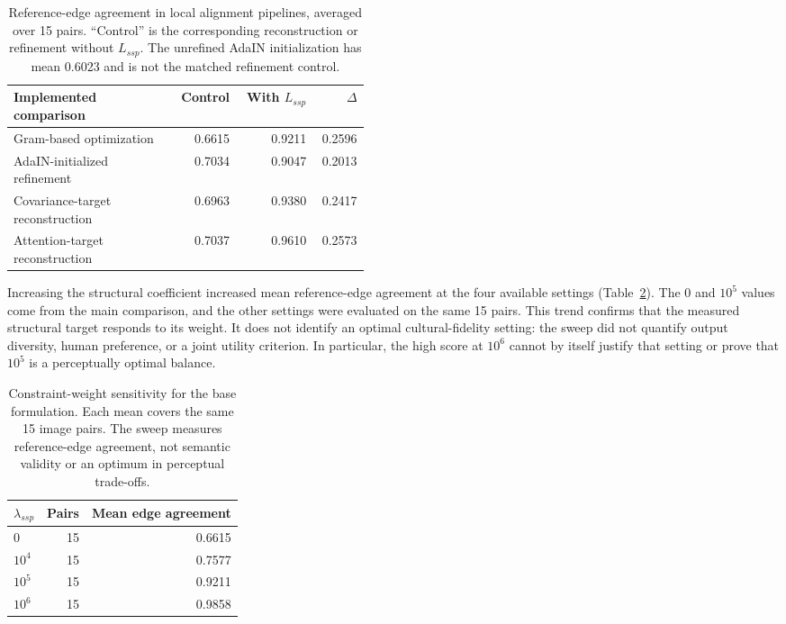 \documentclass[manuscript,acmlarge,screen,review]{acmart}
\begin{document}
\begin{table}[t]
\centering
\caption{Reference-edge agreement in local alignment pipelines, averaged over 15 pairs. ``Control'' is the corresponding reconstruction or refinement without $L_{ssp}$. The unrefined AdaIN initialization has mean 0.6023 and is not the matched refinement control.}
\label{tab:alignment}
\begin{tabular}{@{}p{0.46\linewidth}rrr@{}}
\toprule
Implemented comparison & Control & With $L_{ssp}$ & $\Delta$\\
\midrule
Gram-based optimization & 0.6615 & 0.9211 & 0.2596\\
AdaIN-initialized refinement & 0.7034 & 0.9047 & 0.2013\\
Covariance-target reconstruction & 0.6963 & 0.9380 & 0.2417\\
Attention-target reconstruction & 0.7037 & 0.9610 & 0.2573\\
\bottomrule
\end{tabular}
\end{table}

Increasing the structural coefficient increased mean reference-edge agreement at the four available settings (Table~\ref{tab:lambda}). The $0$ and $10^5$ values come from the main comparison, and the other settings were evaluated on the same 15 pairs. This trend confirms that the measured structural target responds to its weight. It does not identify an optimal cultural-fidelity setting: the sweep did not quantify output diversity, human preference, or a joint utility criterion. In particular, the high score at $10^6$ cannot by itself justify that setting or prove that $10^5$ is a perceptually optimal balance.

\begin{table}[t]
\centering
\caption{Constraint-weight sensitivity for the base formulation. Each mean covers the same 15 image pairs. The sweep measures reference-edge agreement, not semantic validity or an optimum in perceptual trade-offs.}
\label{tab:lambda}
\begin{tabular}{@{}lrr@{}}
\toprule
$\lambda_{ssp}$ & Pairs & Mean edge agreement\\
\midrule
$0$ & 15 & 0.6615\\
$10^4$ & 15 & 0.7577\\
$10^5$ & 15 & 0.9211\\
$10^6$ & 15 & 0.9858\\
\bottomrule
\end{tabular}
\end{table}
\end{document}
